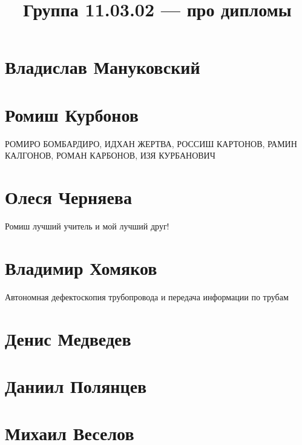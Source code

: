 \documentclass{article}
\title{Группа 11.03.02 --- про дипломы}
\begin{document}
\section*{Владислав Мануковский}

\section*{Ромиш Курбонов}

РОМИРО БОМБАРДИРО, ИДХАН ЖЕРТВА, РОССИШ КАРТОНОВ, РАМИН КАЛГОНОВ, РОМАН КАРБОНОВ, ИЗЯ КУРБАНОВИЧ

\section*{Олеся Черняева}
Ромиш лучший учитель и мой лучший друг!

\section*{Владимир Хомяков} 
Автономная дефектоскопия трубопровода и передача информации по трубам

\section*{Денис Медведев}

\section*{Даниил Полянцев}

\section*{Михаил Веселов}
\end{document}
